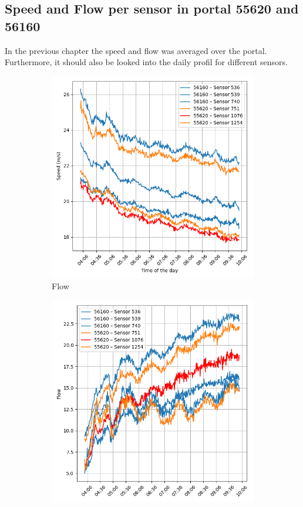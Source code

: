 	\subsection{Speed and Flow per sensor in portal 55620 and 56160}
	In the previous chapter the speed and flow was averaged over the portal. Furthermore, it should also be looked into the daily profil for different sensors.
	\begin{figure}[H]
		\centering
		\begin{subfigure}{0.49 \linewidth}
			\includegraphics[width=\textwidth]{../Plots/Speed/avg_speed_day_per_sensor_portal}
			\caption{Flow}
		\end{subfigure}
		\begin{subfigure}{0.49 \linewidth}
			\includegraphics[width=\textwidth]{../Plots/Flow/avg_flow_day_per_sensor_portal}

\end{subfigure}
\end{figure}
